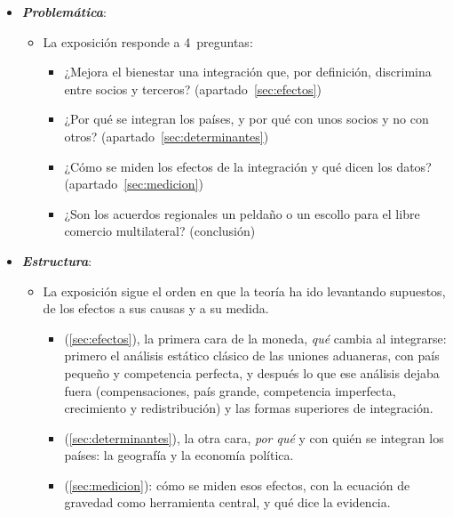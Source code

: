 \documentclass[11pt]{article}
\begin{document}
\begin{itemize}
\begin{itemize}
\begin{itemize}
  \item Como el libre comercio mundial es inalcanzable, la integración se ha entendido siempre como un \emph{segundo óptimo} del librecambio de  y : elimina unas distorsiones y mantiene otras .\footnote{Los procesos de integración eliminan algunas distorsiones pero mantienen otras respecto del libre comercio, tanto en los países que se integran como en los de fuera, y por eso no llevan a óptimos de : con la integración no se puede garantizar que mejore el bienestar de todos los países respecto de la situación de partida.}
  \end{itemize}
  \end{itemize}

\item \textbf{\emph{Problemática}}:
  \begin{itemize}
  \item La exposición responde a 4~preguntas:
  \begin{itemize}
  \item ¿Mejora el bienestar una integración que, por definición, discrimina entre socios y terceros? (apartado~\ref{sec:efectos})
  \item ¿Por qué se integran los países, y por qué con unos socios y no con otros? (apartado~\ref{sec:determinantes})
  \item ¿Cómo se miden los efectos de la integración y qué dicen los datos? (apartado~\ref{sec:medicion})
  \item ¿Son los acuerdos regionales un peldaño o un escollo para el libre comercio multilateral? (conclusión)
  \end{itemize}
  \end{itemize}

\item \textbf{\emph{Estructura}}:
  \begin{itemize}
  \item La exposición sigue el orden en que la teoría ha ido levantando supuestos, de los efectos a sus causas y a su medida.
  \begin{itemize}
  \item {} (\ref{sec:efectos}), la primera cara de la moneda, \emph{qué} cambia al integrarse: primero el análisis estático clásico de las uniones aduaneras, con país pequeño y competencia perfecta, y después lo que ese análisis dejaba fuera (compensaciones, país grande, competencia imperfecta, crecimiento y redistribución) y las formas superiores de integración.
  \item {} (\ref{sec:determinantes}), la otra cara, \emph{por qué} y con quién se integran los países: la geografía y la economía política.
  \item {} (\ref{sec:medicion}): cómo se miden esos efectos, con la ecuación de gravedad como herramienta central, y qué dice la evidencia.
  \end{itemize}
  \end{itemize}
\end{itemize}
\end{document}
